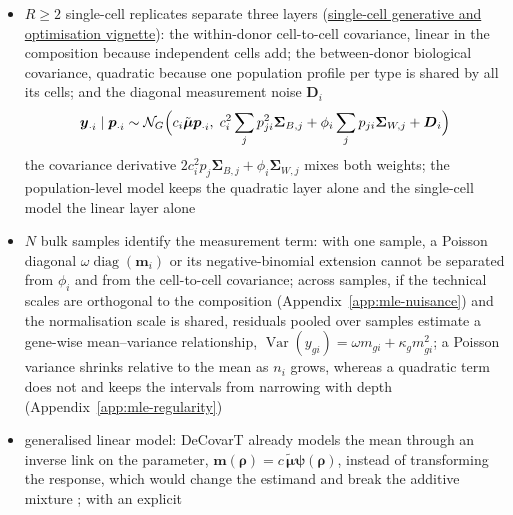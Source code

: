 \documentclass[pdflatex, sn-nature]{sn-jnl}
\theoremstyle{thmstyleone}%
\theoremstyle{thmstyletwo}%
\theoremstyle{thmstylethree}%
\newcommand{\vignette}[2]{\href{https://bastienchassagnol.github.io/DeCovarT/articles/#1}{#2}}
\begin{document}
\begin{itemize}
  \item \(R\ge2\) single-cell replicates separate three layers
        (\vignette{02-1-single-cell-generative-optimisation.html\#sec-reference}{single-cell generative and optimisation vignette}):
        the within-donor cell-to-cell covariance, linear in the composition because independent cells add;
        the between-donor biological covariance, quadratic because one population profile per type is shared
        by all its cells; and the diagonal measurement noise \(\boldsymbol{D}_{i}\)
        \cite{zimmermanPracticalSolutionPseudoreplication2021}
        \begin{equation}
          \boldsymbol{y}_{\cdot i}\mid\boldsymbol{p}_{\cdot i}\sim\mathcal{N}_{G}\Bigl(c_{i}\tilde{\boldsymbol{\mu}}\boldsymbol{p}_{\cdot i},\;
          c_{i}^{2}\sum_{j}p_{ji}^{2}\boldsymbol{\Sigma}_{B,j}+\phi_{i}\sum_{j}p_{ji}\boldsymbol{\Sigma}_{W,j}+\boldsymbol{D}_{i}\Bigr)
          \label{eq:four-layer}
        \end{equation}
        the covariance derivative \(2c_{i}^{2}p_{j}\boldsymbol{\Sigma}_{B,j}+\phi_{i}\boldsymbol{\Sigma}_{W,j}\) mixes both weights; the
        population-level model keeps the quadratic layer alone and the single-cell model the linear layer alone
  \item \(N\) bulk samples identify the measurement term: with one sample, a Poisson diagonal
        \(\omega\operatorname{diag}(\boldsymbol{m}_{i})\) or its negative-binomial extension cannot be separated from \(\phi_{i}\) and from
        the cell-to-cell covariance; across samples, if the technical scales are orthogonal to the composition
        (Appendix~\ref{app:mle-nuisance}) and the normalisation scale is shared, residuals pooled over samples
        estimate a gene-wise mean--variance relationship, \(\operatorname{Var}(y_{gi})=\omega m_{gi}+\kappa_{g}m_{gi}^{2}\); a Poisson
        variance shrinks relative to the mean as \(n_{i}\) grows, whereas a quadratic term does not and keeps
        the intervals from narrowing with depth (Appendix~\ref{app:mle-regularity})
  \item generalised linear model: DeCovarT already models the mean through an inverse link on the parameter,
        \(\boldsymbol{m}(\boldsymbol{\rho})=c\,\tilde{\boldsymbol{\mu}}\boldsymbol{\psi}(\boldsymbol{\rho})\), instead of transforming the response, which would change
        the estimand and break the additive mixture \cite{agrestiFoundationsLinearGeneralized2015}; with an explicit

\end{itemize}
\end{document}
